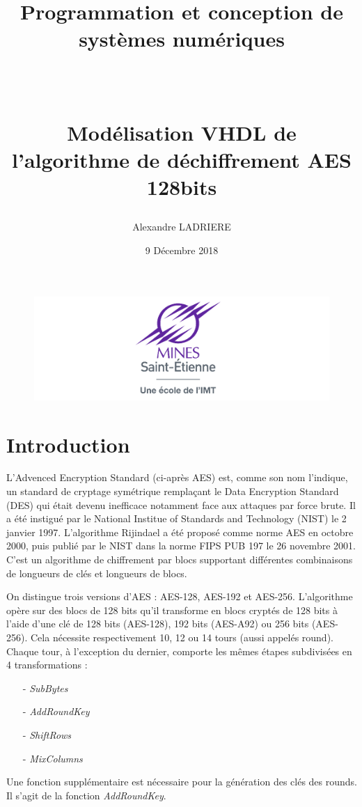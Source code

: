 \documentclass[a4paper, 12pt]{article}
\title{\huge{\begin{bf} Programmation et conception de systèmes numériques\end{bf}} \\ \begin{doublespacing} \large{Modélisation VHDL de l'algorithme de déchiffrement AES 128bits} \end{doublespacing} \vspace{\fill}}
\author{Alexandre LADRIERE}
\date{9 Décembre 2018}
\begin{document}
	\begin{figure}
	\begin{center}
	\includegraphics[scale=0.5]{Images/emse_new.png}
	\end{center}
	\end{figure}

\maketitle\thispagestyle{empty}
\newpage
\tableofcontents
\newpage

\section{Introduction}
L'Advenced Encryption Standard (ci-après AES) est, comme son nom l'indique, un standard de cryptage symétrique remplaçant le Data Encryption Standard (DES) qui était devenu inefficace notamment face aux attaques par force brute. Il a été instigué par le National Institue of Standards and Technology (NIST) le 2 janvier 1997. L'algorithme Rijindael a été proposé comme norme AES en octobre 2000, puis publié par le NIST dans la norme FIPS PUB 197 le 26 novembre 2001. C'est un algorithme de chiffrement par blocs supportant différentes combinaisons de longueurs de clés et longueurs de blocs. 
\par On distingue trois versions d’AES : AES-128, AES-192 et AES-256.
L’algorithme opère sur des blocs de 128 bits qu’il transforme en blocs cryptés de 128 bits à l’aide d’une clé de 128 bits (AES-128), 192 bits (AES-A92) ou 256 bits (AES-256). Cela nécessite respectivement 10, 12 ou 14 tours (aussi appelés round).
Chaque tour, à l’exception du dernier, comporte les mêmes étapes subdivisées en 4 transformations :
	\begin{itemize}
		\item[-] \emph{SubBytes}
		\item[-] \emph{AddRoundKey}
		\item[-] \emph{ShiftRows}
		\item[-] \emph{MixColumns}
	\end{itemize}
Une fonction supplémentaire est nécessaire pour la génération des clés des rounds. Il s'agit de la fonction \emph{AddRoundKey}.
\end{document}
